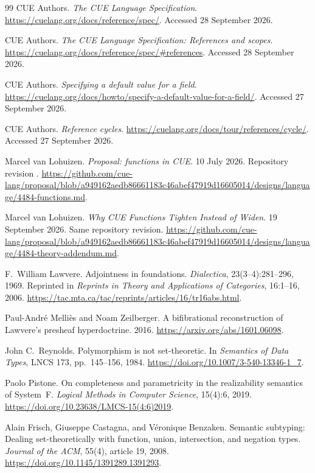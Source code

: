 \documentclass[10pt,a4paper]{article}
\newcommand{\code}[1]{\texttt{\detokenize{#1}}}
\theoremstyle{remark}
\begin{document}
\begin{thebibliography}{99}
\small
{}
CUE Authors. \emph{The CUE Language Specification}.
\url{https://cuelang.org/docs/reference/spec/}. Accessed 28 September 2026.

CUE Authors. \emph{The CUE Language Specification: References and scopes}.
\url{https://cuelang.org/docs/reference/spec/#references}.
Accessed 28 September 2026.

CUE Authors. \emph{Specifying a default value for a field}.
\url{https://cuelang.org/docs/howto/specify-a-default-value-for-a-field/}.
Accessed 27 September 2026.

CUE Authors. \emph{Reference cycles}.
\url{https://cuelang.org/docs/tour/references/cycle/}.
Accessed 27 September 2026.

Marcel van Lohuizen. \emph{Proposal: functions in CUE}. 10 July 2026.
Repository revision \code{a949162aedb8}.
\url{https://github.com/cue-lang/proposal/blob/a949162aedb86661183c46abef47919d16605014/designs/language/4484-functions.md}.

Marcel van Lohuizen. \emph{Why CUE Functions Tighten Instead of Widen}.
19 September 2026. Same repository revision.
\url{https://github.com/cue-lang/proposal/blob/a949162aedb86661183c46abef47919d16605014/designs/language/4484-theory-addendum.md}.

F.~William Lawvere. Adjointness in foundations.
\emph{Dialectica}, 23(3--4):281--296, 1969.
Reprinted in \emph{Reprints in Theory and Applications of Categories},
16:1--16, 2006.
\url{https://tac.mta.ca/tac/reprints/articles/16/tr16abs.html}.

Paul-Andr\'e Melli\`es and Noam Zeilberger.
A bifibrational reconstruction of Lawvere's presheaf hyperdoctrine.
2016. \url{https://arxiv.org/abs/1601.06098}.

John C.~Reynolds. Polymorphism is not set-theoretic.
In \emph{Semantics of Data Types}, LNCS 173, pp.~145--156, 1984.
\url{https://doi.org/10.1007/3-540-13346-1_7}.

Paolo Pistone. On completeness and parametricity in the realizability semantics
of System~F. \emph{Logical Methods in Computer Science}, 15(4):6, 2019.
\url{https://doi.org/10.23638/LMCS-15(4:6)2019}.

Alain Frisch, Giuseppe Castagna, and V\'eronique Benzaken.
Semantic subtyping: Dealing set-theoretically with function, union,
intersection, and negation types.
\emph{Journal of the ACM}, 55(4), article 19, 2008.
\url{https://doi.org/10.1145/1391289.1391293}.


\end{thebibliography}
\end{document}
